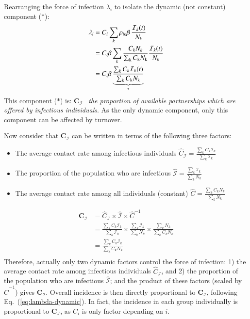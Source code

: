 Rearranging the force of infection $\lambda_i$
to isolate the dynamic (not constant) component ($*$):
\begin{equation}\label{eq:lambda-dynamic}
\begin{aligned}
  \lambda_i
    &= C_i \sum_k \rho_{ik} \beta \thinspace \frac{\mathcal{I}_k(t)}{N_k}\\
    &= C_i \beta \sum_k
    \frac{C_k N_k}{\sum_{\mathrm{k}}C_{\mathrm{k}}N_{\mathrm{k}}}
    \frac{\mathcal{I}_k(t)}{N_k}\\
    &= C_i \beta \underbrace{
      \frac{\sum_k C_k \mathcal{I}_k(t)}{\sum_{\mathrm{k}}C_{\mathrm{k}}N_{\mathrm{k}}}
    }_{\text{*}}
\end{aligned}
\end{equation}
This component ($*$) is:
$\bm{C}_{\mathcal{I}}$~%
\textit{the proportion of available partnerships which are offered by infectious individuals}.
As the only dynamic component, only this component can be affected by turnover.
\par
Now consider that $\bm{C}_{\mathcal{I}}$
can be written in terms of the following three factors:
\begin{itemize}
  \item The average contact rate among infectious individuals
  $\hat{C}_{\mathcal{I}} = \frac{\sum_k C_k \mathcal{I}_k}{\sum_k \mathcal{I}_k}$
  \item The proportion of the population who are infectious
  $\hat{\mathcal{I}} = \frac{\sum_k \mathcal{I}_k}{\sum_k N_k}$
  \item The average contact rate among all individuals (constant)
  $\hat{C} = \frac{\sum_k C_k N_k}{\sum_k N_k}$
\end{itemize}
\begin{equation}
\begin{aligned}
\bm{C}_{\mathcal{I}}
&= \hat{C}_{\mathcal{I}} \times \hat{\mathcal{I}} \times \hat{C}^{-1}\\
&= \frac{\sum_k C_k \mathcal{I}_k}{\sum_k \mathcal{I}_k}
\times
\frac{\sum_k \mathcal{I}_k}{\sum_k N_k}
\times
\frac{\sum_k N_k}{\sum_k C_k N_k}\\
&= \frac{\sum_k C_k \mathcal{I}_k}{\sum_{\mathrm{k}}C_{\mathrm{k}}N_{\mathrm{k}}}\\
\end{aligned}
\end{equation}
Therefore, actually only two dynamic factors control the force of infection:
1) the average contact rate among infectious individuals $\hat{C}_{\mathcal{I}}$, and
2) the proportion of the population who are infectious $\hat{\mathcal{I}}$;
and the product of these factors (scaled by $\hat{C}^{-1}$) gives $\bm{C}_{\mathcal{I}}$.
Overall incidence is then directly proportional to $\bm{C}_{\mathcal{I}}$,
following Eq.~(\ref{eq:lambda-dynamic}).
In fact, the incidence in each group individually is proportional to $\bm{C}_{\mathcal{I}}$,
as $C_i$ is only factor depending on $i$.